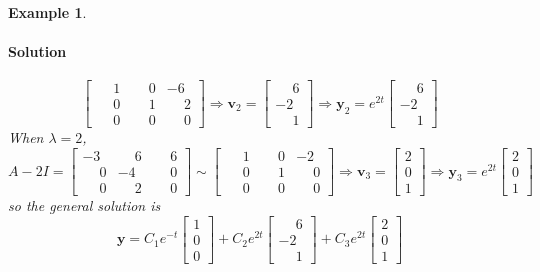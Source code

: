 \documentclass[letterpaper, 11pt, openany]{book}
\theoremstyle{mytheoremstyle}
\theoremstyle{myexamplestyle}
\newtheorem{example}{Example}[section]
\newenvironment{solution}{\paragraph{\sffamily \smaller \fontseries{b}\selectfont Solution}}{\hfill\faSquare}
\begin{document}
\begin{example}
\begin{solution}
\[\begin{bmatrix}
             \phantom{-}1 &  \phantom{-}0 & -6 \\
             \phantom{-}0 &  \phantom{-}1 &  \phantom{-}2 \\
             \phantom{-}0 &  \phantom{-}0 &  \phantom{-}0
        \end{bmatrix} \Rightarrow \mathbf{v}_{2} = \begin{bmatrix}
             \phantom{-}6 \\ - 2 \\  \phantom{-}1
        \end{bmatrix} \Rightarrow \mathbf{y}_{2} = e^{2t}\begin{bmatrix}
            \phantom{-}6 \\ - 2 \\  \phantom{-}1
        \end{bmatrix}\]
        When \(\lambda = 2\),
        \[A - 2I = \begin{bmatrix}
            -3 &  \phantom{-}6 &  \phantom{-}6 \\
             \phantom{-}0 & -4 &  \phantom{-}0 \\
             \phantom{-}0 &  \phantom{-}2 &  \phantom{-}0
        \end{bmatrix} \sim \begin{bmatrix}
             \phantom{-}1 &  \phantom{-}0 & -2 \\
             \phantom{-}0 &  \phantom{-}1 &  \phantom{-}0 \\
             \phantom{-}0 &  \phantom{-}0 &  \phantom{-}0 
        \end{bmatrix} \Rightarrow \mathbf{v}_{3} = \begin{bmatrix}
            2 \\ 0 \\ 1
        \end{bmatrix} \Rightarrow \mathbf{y}_{3} = e^{2t}\begin{bmatrix}
            2 \\ 0 \\ 1
        \end{bmatrix}\]
        so the general solution is
        \[\mathbf{y} = C_{1} e^{-t}\begin{bmatrix}
            1 \\ 0 \\ 0
        \end{bmatrix} + C_{2}e^{2t}\begin{bmatrix}
            \phantom{-}6 \\ - 2 \\  \phantom{-}1
        \end{bmatrix} + C_{3} e^{2t}\begin{bmatrix}
            2 \\ 0 \\ 1
        \end{bmatrix} \]
    \end{solution}
\end{example}
\end{document}
